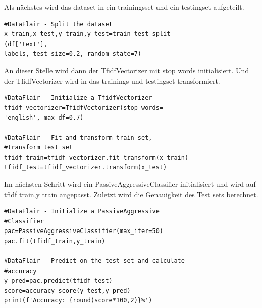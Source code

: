 \documentclass[conference]{IEEEtran}
\begin{document}
Als nächstes wird das dataset in ein trainingsset und ein testingset aufgeteilt.
\begin{lstlisting}
#DataFlair - Split the dataset
x_train,x_test,y_train,y_test=train_test_split
(df['text'], 
labels, test_size=0.2, random_state=7)
\end{lstlisting}

An dieser Stelle wird dann der TfidfVectorizer mit stop words initialisiert.
Und der TfidfVectorizer wird in das trainings und testingset transformiert.
\begin{lstlisting}
#DataFlair - Initialize a TfidfVectorizer
tfidf_vectorizer=TfidfVectorizer(stop_words=
'english', max_df=0.7)

#DataFlair - Fit and transform train set, 
#transform test set
tfidf_train=tfidf_vectorizer.fit_transform(x_train) 
tfidf_test=tfidf_vectorizer.transform(x_test)
\end{lstlisting}

Im nächsten Schritt wird ein PassiveAggressiveClassifier initialisiert und wird auf tfidf train,y train angepasst.
Zuletzt wird die Genauigkeit des Test sets berechnet.

\begin{lstlisting}
#DataFlair - Initialize a PassiveAggressive
#Classifier
pac=PassiveAggressiveClassifier(max_iter=50)
pac.fit(tfidf_train,y_train)

#DataFlair - Predict on the test set and calculate 
#accuracy
y_pred=pac.predict(tfidf_test)
score=accuracy_score(y_test,y_pred)
print(f'Accuracy: {round(score*100,2)}%')
\end{lstlisting}\cite{b5}
\end{document}
